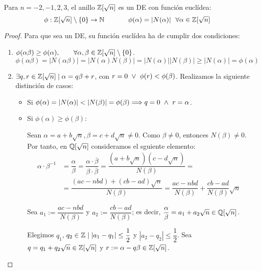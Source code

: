 \begin{teo}
    \label{teo:DEZRaizn}
    Para $n=-2,-1,2,3$, el anillo $\mathbb Z[\sqrt{n}]$ es un DE con función euclídea:
    $$\phi:\mathbb Z[\sqrt{n}]\setminus\{0\}\rightarrow\mathbb N\hspace{1cm}~~ \phi(\alpha)=|N(\alpha)|~~\forall \alpha \in \mathbb Z[\sqrt{n}]$$
\end{teo}
\begin{proof}
    Para que sea un DE, su función euclídea ha de cumplir dos condiciones:
    \begin{enumerate}
        \item $\phi(\alpha\beta)\geq \phi(\alpha), \qquad \forall \alpha,\beta \in \mathbb Z[\sqrt{n}]\setminus \{0\}$.
        $$\phi(\alpha\beta) = |N(\alpha\beta)| = |N(\alpha)N(\beta)| = |N(\alpha)||N(\beta)| \geq |N(\alpha)| = \phi(\alpha)$$

        \item $\exists q,r\in \mathbb Z[\sqrt{n}]\mid \alpha=q\beta + r$, con $r=0\ \lor \  \phi(r)<\phi(\beta)$. Realizamos la siguiente distinción de casos:
        \begin{itemize}
            \item Si $\phi(\alpha) = |N(\alpha)| < |N(\beta)| = \phi(\beta) \Longrightarrow q=0 \ \land \  r=\alpha$.
            \item Si $\phi(\alpha)\geq \phi(\beta)$:

            Sean $\alpha=a+b\sqrt{n}, \beta=c+d\sqrt{n}\neq 0$. Como $\beta\neq 0$, entonces $N(\beta)\neq 0$. Por tanto, en $\mathbb Q[\sqrt{n}]$ consideramos el sguiente elemento:
            \begin{equation*}\begin{split}
                \alpha \cdot \beta^{-1} &= \dfrac{\alpha}{\beta} = \dfrac{\alpha \cdot \overline{\beta}} {\beta \cdot \overline{\beta}} = \dfrac{(a+b\sqrt{n})(c-d\sqrt{n})}{N(\beta)} =\\
                & =\dfrac{(ac-nbd)+(cb-ad)\sqrt{n}}{N(\beta)} = \dfrac{ac-nbd}{N(\beta)} + \dfrac{cb-ad}{N(\beta)}\sqrt{n}
            \end{split}\end{equation*}

            Sea $a_1 := \dfrac{ac-nbd}{N(\beta)}$ y $a_2 := \dfrac{cb-ad}{N(\beta)}$; es decir, $\dfrac{\alpha}{\beta} = a_1 + a_2\sqrt{n} \in \mathbb Q[\sqrt{n}]$.

            Elegimos $q_1$, $q_2 \in \mathbb Z \mid |a_1-q_1| \leq \dfrac{1}{2}$ y $|a_2-q_2| \leq \dfrac{1}{2}$. Sea $q=q_1+q_2\sqrt{n} \in \mathbb Z[\sqrt{n}]$ y $r:=\alpha -q\beta \in \mathbb Z[\sqrt{n}]$.
            

\end{itemize}
\end{enumerate}
\end{proof}
